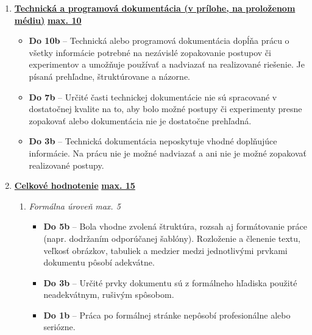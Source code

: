 \begin{enumerate}[label=\textbf{\arabic*.}]
    \item \underline{\textbf{Technická a programová dokumentácia (v prílohe, na proloženom médiu)}} \hfill \underline{\textbf{max. 10}}
    \begin{itemize}
        \item \textbf{Do 10b} – Technická alebo programová dokumentácia dopĺňa prácu o všetky informácie potrebné na nezávislé zopakovanie postupov či experimentov a umožňuje používať a nadviazať na realizované riešenie. Je písaná prehľadne, štruktúrovane a názorne. 
        \item \textbf{Do 7b} – Určité časti technickej dokumentácie nie sú spracované v dostatočnej kvalite na to, aby bolo možné postupy či experimenty presne zopakovať alebo dokumentácia nie je dostatočne prehľadná. 
        \item \textbf{Do 3b} – Technická dokumentácia neposkytuje vhodné doplňujúce informácie. Na prácu nie je možné nadviazať a ani nie je možné zopakovať realizované postupy. 
    \end{itemize}

    \item \underline{\textbf{Celkové hodnotenie}} \hfill \underline{\textbf{max. 15}}
    \begin{enumerate}
        \item \textit{Formálna úroveň} \hfill \textit{max. 5}
        \begin{itemize}
            \item \textbf{Do 5b} – Bola vhodne zvolená štruktúra, rozsah aj formátovanie práce (napr. dodržaním odporúčanej šablóny). Rozloženie a členenie textu, veľkosť obrázkov, tabuliek a medzier medzi jednotlivými prvkami dokumentu pôsobí adekvátne. 
            \item \textbf{Do 3b} – Určité prvky dokumentu sú z formálneho hľadiska použité neadekvátnym, rušivým spôsobom.
            \item \textbf{Do 1b} – Práca po formálnej stránke nepôsobí profesionálne alebo seriózne.
        \end{itemize}


\end{enumerate}
\end{enumerate}
